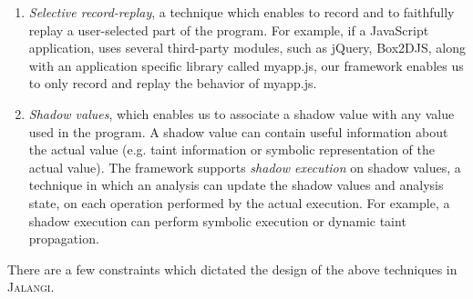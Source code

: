 \documentclass{sig-alternate}
\def\jalangi{\textsc{Jalangi}}
\begin{document}
\begin{enumerate}
\item \emph{Selective record-replay}, a technique which enables to record and
  to faithfully replay a user-selected part of the program.  For
  example, if a JavaScript application, uses several third-party
  modules, such as jQuery, Box2DJS, along with an application specific
  library called myapp.js, our framework enables us to only record and
  replay the behavior of myapp.js.
\item\emph{ Shadow values}, which enables us to associate a shadow
  value with any value used in the program.  A shadow value can
  contain useful information about the actual value (e.g. taint
  information or symbolic representation of the actual value).  The
  framework supports \emph{shadow execution} on shadow values, a
  technique in which an analysis can update the shadow values and
  analysis state, on each operation performed by the actual execution.
  For example, a shadow execution can perform symbolic execution or
  dynamic taint propagation.
\end{enumerate}

There are a few constraints which dictated the design of the above
techniques in \jalangi{}.
\end{document}
